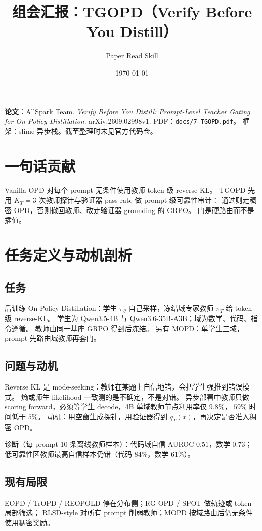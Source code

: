 \documentclass[11pt,a4paper]{ctexart}
\title{组会汇报：TGOPD（Verify Before You Distill）}
\author{Paper Read Skill}
\date{\today}
\begin{document}
\maketitle
\tableofcontents
\newpage

\noindent\textbf{论文}：AllSpark Team.
\textit{Verify Before You Distill: Prompt-Level Teacher Gating for On-Policy Distillation}.
arXiv:2609.02998v1.
PDF：\texttt{docs/7\_TGOPD.pdf}。
框架：slime 异步栈。截至整理时未见官方代码仓。

\section{一句话贡献}
Vanilla OPD 对每个 prompt 无条件使用教师 token 级 reverse-KL。
TGOPD 先用 $K_T=3$ 次教师探针与验证器 pass rate 做 prompt 级可靠性审计：
通过则走稠密 OPD，否则撤回教师、改走验证器 grounding 的 GRPO。
门是硬路由而不是插值。

\section{任务定义与动机剖析}

\subsection{任务}
后训练 On-Policy Distillation：学生 $\pi_\theta$ 自己采样，冻结域专家教师 $\pi_T$ 给 token 级 reverse-KL。
学生为 Qwen3.5-4B 与 Qwen3.6-35B-A3B；域为数学、代码、指令遵循。
教师由同一基座 GRPO 得到后冻结。
另有 MOPD：单学生三域，prompt 先路由域教师再套门。

\subsection{问题与动机}
Reverse KL 是 mode-seeking：教师在某题上自信地错，会把学生强推到错误模式。
熵或师生 likelihood 一致测的是不确定，不是对错。
异步部署中教师只做 scoring forward，必须等学生 decode，4B 单域教师节点利用率仅 $9.8\%$，
$59\%$ 时间低于 $5\%$。
动机：用空窗生成探针，用验证器得到 $q_T(x)$，再决定是否准入稠密 OPD。

诊断（每 prompt 10 条离线教师样本）：代码域自信 AUROC $0.51$，数学 $0.73$；
低可靠性区教师最高自信样本仍错（代码 $84\%$，数学 $61\%$）。

\subsection{现有局限}
EOPD / TrOPD / REOPOLD 停在分布侧；RG-OPD / SPOT 做轨迹或 token 局部筛选；
RLSD-style 对所有 prompt 削弱教师；MOPD 按域路由后仍无条件使用稠密奖励。
\end{document}
